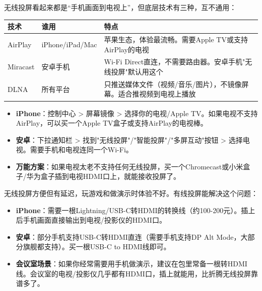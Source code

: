 


无线投屏看起来都是“手机画面到电视上”，但底层技术有三种，互不通用：

\begin{center}
\begin{tabularx}{\linewidth}{|X|X|X|}
\hline
\textbf{技术} & \textbf{谁用} & \textbf{特点} \tabularnewline
\hline
AirPlay & iPhone/iPad/Mac & 苹果生态，体验最流畅。需要Apple TV或支持AirPlay的电视 \tabularnewline
Miracast & 安卓手机 & Wi-Fi Direct直连，不需要路由器。安卓手机"无线投屏"默认用这个 \tabularnewline
DLNA & 所有平台 & 只推送媒体文件（视频/音乐/图片），不镜像屏幕。适合推视频到电视上播放 \tabularnewline
\hline
\end{tabularx}
\end{center}


\begin{itemize}
  \item \textbf{iPhone}：控制中心 > 屏幕镜像 > 选择你的电视/Apple TV。如果电视不支持AirPlay，可以买一个Apple TV盒子或支持AirPlay的电视棒。
  \item \textbf{安卓}：下拉通知栏 > 找到"无线投屏"/"智能投屏"/"多屏互动"按钮 > 选择电视。需要手机和电视连同一个Wi-Fi。
  \item \textbf{万能方案}：如果电视太老不支持任何无线投屏，买一个Chromecast或小米盒子/华为盒子插到电视HDMI口上，就能接收投屏了。
\end{itemize}


无线投屏方便但有延迟，玩游戏和做演示时体验不好。有线投屏能解决这个问题：

\begin{itemize}
  \item \textbf{iPhone}：需要一根Lightning/USB-C转HDMI的转换线（约100-200元）。插上后手机画面直接输出到电视/投影仪的HDMI口。
  \item \textbf{安卓}：部分手机支持USB-C转HDMI直连（需要手机支持DP Alt Mode，大部分旗舰都支持）。买一根USB-C to HDMI线即可。
  \item \textbf{会议室场景}：如果你经常需要用手机做演示，建议在包里常备一根转HDMI线。会议室的电视/投影仪几乎都有HDMI口，插上就能用，比折腾无线投屏靠谱多了。
\end{itemize}

